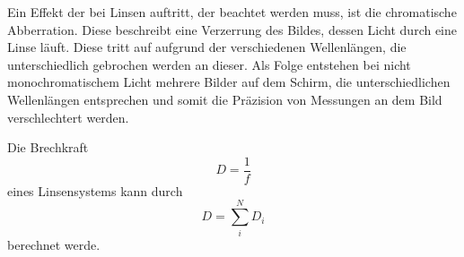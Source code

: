     \noindent Ein Effekt der bei Linsen auftritt, der beachtet werden muss, ist die chromatische Abberration. Diese beschreibt eine Verzerrung des Bildes, dessen Licht durch eine Linse läuft. Diese tritt auf aufgrund der verschiedenen Wellenlängen, die unterschiedlich gebrochen werden an dieser.
    Als Folge entstehen bei nicht monochromatischem Licht mehrere Bilder auf dem Schirm, die unterschiedlichen Wellenlängen entsprechen und somit die Präzision von Messungen an dem Bild verschlechtert werden.

    Die Brechkraft
    \begin{equation}
        \label{eqn.Brechkraft}
        D=\frac{1}{f}
    \end{equation}
    eines Linsensystems kann durch
    \begin{equation}
        D=\sum_i^N{D_i}
        \label{Brechkraft2}
    \end{equation}
    berechnet werde.

